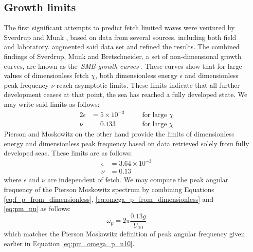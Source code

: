 \subsection{Growth limits}
%
The first significant attempts to predict fetch limited waves were ventured by
Sverdrup and Munk \citep{book:breakersandsurf1944,book:breakersandsurfsupplement1945},
based on data from several sources, including both field and laboratory.
\citet{article:Bretschneider1952} augmented said data set and refined the 
results. The combined findings of Sverdrup, Munk and Bretschneider, a set of 
non-dimensional growth curves, are known as the~\emph{SMB growth curves}
\citep{book:cerc1977}. These curves show that for large values of dimensionless 
fetch $\chi$, both dimensionless energy $\epsilon$ and dimensionless peak 
frequency $\nu$ reach asymptotic limits. These limits indicate that all further 
development ceases at that point, the sea has reached a fully developed state. 
We may write said limits as follows:
\begin{alignat*}{2}
 \epsilon &= 5\times10^{-3} \quad && \text{for large } \chi \\
 \nu &= 0.133 \quad && \text{for large } \chi
\end{alignat*}
Pierson and Moskowitz on the other hand provide the limits of dimensionless 
energy and dimensionless peak frequency based on data retrieved solely from 
fully developed seas. These limits are as follows:
\begin{align}
 \epsilon &= 3.64\times10^{-3} \\
 \nu &= 0.13 \label{eq:pm_nu}
\end{align}
where $\epsilon$ and $\nu$ are independent of fetch. We may compute the peak
angular frequency of the Pierson Moskowitz spectrum by combining Equations
\ref{eq:f_p_from_dimensionless}, \ref{eq:omega_p_from_dimensionless} and
\ref{eq:pm_nu} as follows:
\begin{equation*}
 \omega_p = 2\pi\frac{0.13g}{U_{10}}
\end{equation*}
which matches the Pierson Moskowitz definition of peak angular frequency
given earlier in Equation \ref{eq:pm_omega_p_u10}.

